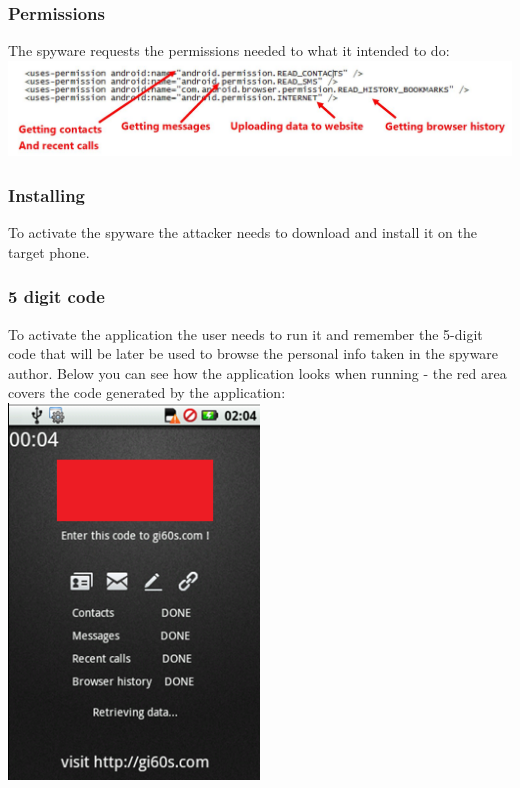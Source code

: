 \subsubsection{Permissions}
\parbox{\textwidth}{
The spyware requests the permissions needed to what it intended to do: \\
\includegraphics[width=\textwidth]{figs/gone60_4.JPG}
}

\subsubsection{Installing}
To activate the spyware the attacker needs to download and install it on the target phone.

\subsubsection{5 digit code}
\parbox{\textwidth}{
To activate the application the user needs to run it and remember the 5-digit code that will be later be used to browse the personal info taken in the spyware author. Below you can see how the application looks when running - the red area covers the code generated by the application: \\
\includegraphics[width=0.5\textwidth]{figs/gone60_5.png}
}

